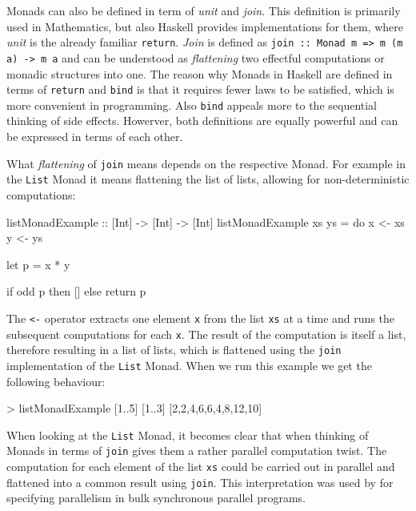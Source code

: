 Monads can also be defined in term of \textit{unit} and \textit{join}. This definition is primarily used in Mathematics, but also Haskell provides implementations for them, where \textit{unit} is the already familiar \texttt{return}. \textit{Join} is defined as \texttt{join :: Monad m => m (m a) -> m a} and can be understood as \textit{flattening} two effectful computations or monadic structures into one. The reason why Monads in Haskell are defined in terms of \texttt{return} and \texttt{bind} is that it requires fewer laws to be satisfied, which is more convenient in programming. Also \texttt{bind} appeals more to the sequential thinking of side effects. Howerver, both definitions are equally powerful and can be expressed in terms of each other.

What \textit{flattening} of \texttt{join} means depends on the respective Monad. For example in the \texttt{List} Monad it means flattening the list of lists, allowing for non-deterministic computations:

\begin{HaskellCode}
listMonadExample :: [Int] -> [Int] -> [Int]
listMonadExample xs ys = do
  x <- xs
  y <- ys
  
  let p = x * y

  if odd p
    then []
    else return p
\end{HaskellCode}

The \texttt{<-} operator extracts one element \texttt{x} from the list \texttt{xs} at a time and runs the subsequent computations for each \texttt{x}. The result of the computation is itself a list, therefore resulting in a list of lists, which is flattened using the \texttt{join} implementation of the \texttt{List} Monad. When we run this example we get the following behaviour:

\begin{HaskellCode}
> listMonadExample [1..5] [1..3]
[2,2,4,6,6,4,8,12,10]
\end{HaskellCode}

When looking at the \texttt{List} Monad, it becomes clear that when thinking of Monads in terms of \texttt{join} gives them a rather parallel computation twist. The computation for each element of the list \texttt{xs} could be carried out in parallel and flattened into a common result using \texttt{join}. This interpretation was used by \cite{botta2007relation} for specifying parallelism in bulk synchronous parallel programs.

